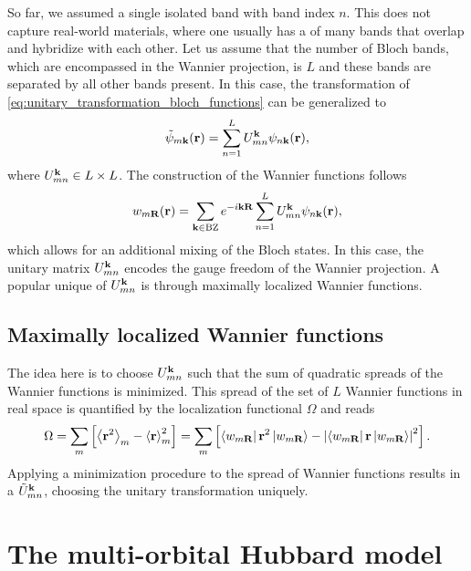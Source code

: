 \documentclass[../../main.tex]{subfiles}
\begin{document}
So far, we assumed a single isolated band with band index $n$. This does not capture real-world materials, where one usually has a  of many bands that overlap and hybridize with each other. Let us assume that the number of Bloch bands, which are encompassed in the Wannier projection, is $L$ and these bands are separated by all other bands present. In this case, the transformation of \eqref{eq:unitary_transformation_bloch_functions} can be generalized to
\begin{align}
		\tilde{\psi}_{m\textbf{k}}(\textbf{r})=\sum_{n=1}^{L}U_{mn}^{\textbf{k}}\psi_{n\textbf{k}}(\textbf{r}),
\end{align}
where $U_{mn}^{\textbf{k}}\in L\times L$. The construction of the Wannier functions follows
\begin{align}
	w_{m\textbf{R}}(\textbf{r})=\sum_{\textbf{k}\in\text{BZ}}e^{-i\textbf{kR}}\sum_{n=1}^{L}U_{mn}^{\textbf{k}}\psi_{n\textbf{k}}(\textbf{r}),
\end{align}
which allows for an additional mixing of the Bloch states. In this case, the unitary matrix $U_{mn}^{\textbf{k}}$ encodes the gauge freedom of the Wannier projection. A popular unique  of $U_{mn}^{\textbf{k}}$ is through maximally localized Wannier functions.

\subsection{Maximally localized Wannier functions}\label{sec:maximally_localized_wannier_functions}

The idea here is to choose $U_{mn}^{\textbf{k}}$ such that the sum of quadratic spreads of the Wannier functions is minimized. This spread of the set of $L$ Wannier functions in real space is quantified by the localization functional $\Omega$ and reads
\begin{align}
	\Omega=\sum_m \left [\left\langle \textbf{r}^2\right\rangle_m-\left\langle \textbf{r}\right\rangle^2_m\right ]=\sum_m \left [\bra{w_{m\textbf{R}}} \textbf{r}^2 \ket{w_{m\textbf{R}}}-\left |\bra{w_{m\textbf{R}}} \textbf{r} \ket{w_{m\textbf{R}}}\right |^2\right ].
\end{align}
Applying a minimization procedure to the spread of Wannier functions results in a  $\tilde U_{mn}^{\textbf{k}}$, choosing the unitary transformation uniquely.

\section{The multi-orbital Hubbard model}\label{sec:multi_orbital_hubbard}
\end{document}
